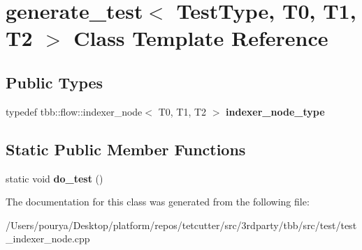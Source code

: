 \hypertarget{classgenerate__test_3_01TestType_00_01T0_00_01T1_00_01T2_01_4}{}\section{generate\+\_\+test$<$ Test\+Type, T0, T1, T2 $>$ Class Template Reference}
\label{classgenerate__test_3_01TestType_00_01T0_00_01T1_00_01T2_01_4}
\subsection*{Public Types}
\begin{DoxyCompactItemize}
\item 
\hypertarget{classgenerate__test_3_01TestType_00_01T0_00_01T1_00_01T2_01_4_ab64c8ddc5ff604a5e71d77bfd97e91f9}{}typedef tbb\+::flow\+::indexer\+\_\+node$<$ T0, T1, T2 $>$ {\bfseries indexer\+\_\+node\+\_\+type}\label{classgenerate__test_3_01TestType_00_01T0_00_01T1_00_01T2_01_4_ab64c8ddc5ff604a5e71d77bfd97e91f9}

\end{DoxyCompactItemize}
\subsection*{Static Public Member Functions}
\begin{DoxyCompactItemize}
\item 
\hypertarget{classgenerate__test_3_01TestType_00_01T0_00_01T1_00_01T2_01_4_a9518b2d41ff1b6def631ea9b5a70874e}{}static void {\bfseries do\+\_\+test} ()\label{classgenerate__test_3_01TestType_00_01T0_00_01T1_00_01T2_01_4_a9518b2d41ff1b6def631ea9b5a70874e}

\end{DoxyCompactItemize}


The documentation for this class was generated from the following file\+:\begin{DoxyCompactItemize}
\item 
/\+Users/pourya/\+Desktop/platform/repos/tetcutter/src/3rdparty/tbb/src/test/test\+\_\+indexer\+\_\+node.\+cpp\end{DoxyCompactItemize}
